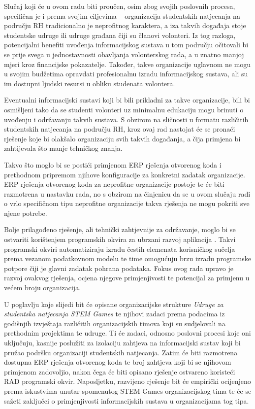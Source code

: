 \documentclass[times, utf8, diplomski]{fer}
\begin{document}
Slučaj koji će u ovom radu biti proučen, osim zbog svojih poslovnih procesa,
specifičan je i prema svojim ciljevima -- organizacija studentskih natjecanja na
području RH tradicionalno je neprofitnog karaktera, a iza takvih događaja stoje
studentske udruge ili udruge građana čiji su članovi volonteri. Iz tog razloga,
potencijalni benefiti uvođenja informacijskog sustava u tom području očitovali
bi se prije svega u jednostavnosti obavljanja volonterskog rada, a u znatno
manjoj mjeri kroz financijske pokazatelje. Također, takve organizacije uglavnom
ne mogu u svojim budžetima opravdati profesionalnu izradu informacijskog
sustava, ali su im dostupni ljudski resursi u obliku studenata volontera.

Eventualni informacijski sustavi koji bi bili prikladni za takve organizacije,
bili bi osmišljeni tako da se studenti volonteri uz minimalnu edukaciju mogu
brinuti o uvođenju i održavanju takvih sustava. S obzirom na sličnosti u formatu
različitih studentskih natjecanja na području RH, kroz ovaj rad nastojat će se
pronaći rješenje koje bi olakšalo organizaciju svih takvih događanja, a čija
primjena bi zahtijevala što manje tehničkog znanja.

Takvo što moglo bi se postići primjenom ERP rješenja otvorenog koda i prethodnom
pripremom njihove konfiguracije za konkretni zadatak organizacije. ERP rješenja
otvorenog koda za neprofitne organizacije postoje te će biti razmotrena u
nastavku rada, no s obzirom na činjenicu da se u ovom slučaju radi o vrlo
specifičnom tipu neprofitne organizacije takva rješenja ne mogu pokriti sve
njene potrebe.

Bolje prilagođeno rješenje, ali tehnički zahtjevnije za održavanje, moglo bi se
ostvariti korištenjem programskih okvira za ubrzani razvoj aplikacija
. Takvi programski okviri automatiziraju izradu čestih elemenata
korisničkog sučelja prema vezanom podatkovnom modelu te time omogućuju brzu
izradu programske potpore čiji je glavni zadatak pohrana podataka. Fokus ovog
rada upravo je razvoj ovakvog rješenja, ocjena njegove primjenjivosti te
potencijal za primjenu u većem broju organizacija.

U poglavlju koje slijedi bit će opisane organizacijske strukture \emph{Udruge za
studentska natjecanja STEM Games} te njihovi zadaci prema podacima iz godišnjih
izvještaja različitih organizacijskih timova koji su sudjelovali na prethodnim
projektima te udruge. Ti će zadaci, odnosno poslovni procesi koje oni uključuju,
kasnije poslužiti za izolaciju zahtjeva na informacijski sustav koji bi pružao
podršku organizaciji studentskih natjecanja. Zatim će biti razmotrena dostupna
ERP rješenja otvorenog koda te broj zahtjeva koji bi se njihovom primjenom
zadovoljio, nakon čega će biti opisano rješenje ostvareno koristeći RAD
programski okvir. Naposljetku, razvijeno rješenje bit će empirički ocijenjeno
prema iskustvima unutar spomenutog STEM Games organizacijskog tima te će se
sažeti zaključci o primjenjivosti informacijskih sustava u organizacijama tog
tipa.
\end{document}
